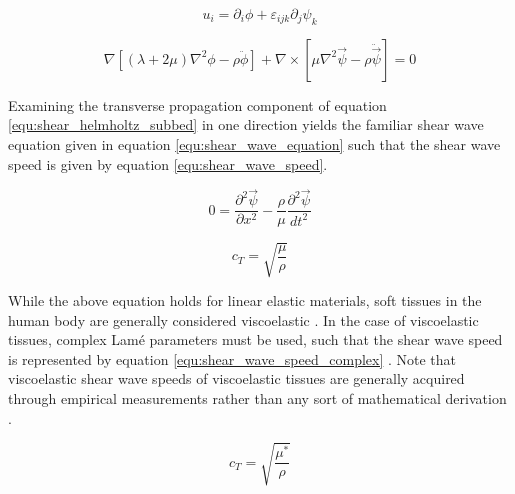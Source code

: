 			\begin{equation}
				\label{equ:shear_helmholtz_decomp}
				u_i = \partial_i \phi + \varepsilon_{ijk}\partial_j\psi_k
			\end{equation}

			\begin{equation}
				\label{equ:shear_helmholtz_subbed}
				\nabla\left[\left(\lambda + 2\mu\right) \nabla^2 \phi - \rho \ddot{\phi}\right] + \nabla \times \left[\mu \nabla^2 \vec{\psi} - \rho\ddot{\vec{\psi}}\right] = 0
			\end{equation}

			Examining the transverse propagation component of equation \ref{equ:shear_helmholtz_subbed} in one direction yields the familiar shear wave equation given in equation \ref{equ:shear_wave_equation} such that the shear wave speed is given by equation \ref{equ:shear_wave_speed}.

			\begin{equation}
				\label{equ:shear_wave_equation}
				0 = \frac{\partial^2 \vec{\psi}}{\partial x^2} - \frac{\rho}{\mu}\frac{\partial^2 \vec{\psi}}{dt^2}
			\end{equation}

			\begin{equation}
				\label{equ:shear_wave_speed}
				c_T = \sqrt{\frac{\mu}{\rho}}
			\end{equation}

			While the above equation holds for linear elastic materials, soft tissues in the human body are generally considered viscoelastic \cite{gras13,wang13}. In the case of viscoelastic tissues, complex Lam\'{e} parameters must be used, such that the shear wave speed is represented by equation \ref{equ:shear_wave_speed_complex} \cite{amador12}. Note that viscoelastic shear wave speeds of viscoelastic tissues are generally acquired through empirical measurements rather than any sort of mathematical derivation \cite{then07,madsen83}.

			\begin{equation}
				\label{equ:shear_wave_speed_complex}
				c_T = \sqrt{\frac{\mu^*}{\rho}}
			\end{equation}

